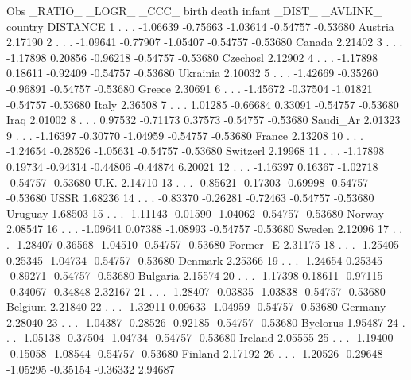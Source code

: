 \documentclass{article}
\begin{document}
\begin{Woutput}
Obs _RATIO_  _LOGR_  _CCC_    birth     death    infant    _DIST_   _AVLINK_  country   DISTANCE
  1    .        .      .    -1.06639  -0.75663  -1.03614  -0.54757  -0.53680  Austria    2.17190
  2    .        .      .    -1.09641  -0.77907  -1.05407  -0.54757  -0.53680  Canada     2.21402
  3    .        .      .    -1.17898   0.20856  -0.96218  -0.54757  -0.53680  Czechosl   2.12902
  4    .        .      .    -1.17898   0.18611  -0.92409  -0.54757  -0.53680  Ukrainia   2.10032
  5    .        .      .    -1.42669  -0.35260  -0.96891  -0.54757  -0.53680  Greece     2.30691
  6    .        .      .    -1.45672  -0.37504  -1.01821  -0.54757  -0.53680  Italy      2.36508
  7    .        .      .     1.01285  -0.66684   0.33091  -0.54757  -0.53680  Iraq       2.01002
  8    .        .      .     0.97532  -0.71173   0.37573  -0.54757  -0.53680  Saudi_Ar   2.01323
  9    .        .      .    -1.16397  -0.30770  -1.04959  -0.54757  -0.53680  France     2.13208
 10    .        .      .    -1.24654  -0.28526  -1.05631  -0.54757  -0.53680  Switzerl   2.19968
 11    .        .      .    -1.17898   0.19734  -0.94314  -0.44806  -0.44874             6.20021
 12    .        .      .    -1.16397   0.16367  -1.02718  -0.54757  -0.53680  U.K.       2.14710
 13    .        .      .    -0.85621  -0.17303  -0.69998  -0.54757  -0.53680  USSR       1.68236
 14    .        .      .    -0.83370  -0.26281  -0.72463  -0.54757  -0.53680  Uruguay    1.68503
 15    .        .      .    -1.11143  -0.01590  -1.04062  -0.54757  -0.53680  Norway     2.08547
 16    .        .      .    -1.09641   0.07388  -1.08993  -0.54757  -0.53680  Sweden     2.12096
 17    .        .      .    -1.28407   0.36568  -1.04510  -0.54757  -0.53680  Former_E   2.31175
 18    .        .      .    -1.25405   0.25345  -1.04734  -0.54757  -0.53680  Denmark    2.25366
 19    .        .      .    -1.24654   0.25345  -0.89271  -0.54757  -0.53680  Bulgaria   2.15574
 20    .        .      .    -1.17398   0.18611  -0.97115  -0.34067  -0.34848             2.32167
 21    .        .      .    -1.28407  -0.03835  -1.03838  -0.54757  -0.53680  Belgium    2.21840
 22    .        .      .    -1.32911   0.09633  -1.04959  -0.54757  -0.53680  Germany    2.28040
 23    .        .      .    -1.04387  -0.28526  -0.92185  -0.54757  -0.53680  Byelorus   1.95487
 24    .        .      .    -1.05138  -0.37504  -1.04734  -0.54757  -0.53680  Ireland    2.05555
 25    .        .      .    -1.19400  -0.15058  -1.08544  -0.54757  -0.53680  Finland    2.17192
 26    .        .      .    -1.20526  -0.29648  -1.05295  -0.35154  -0.36332             2.94687


\end{Woutput}
\end{document}
